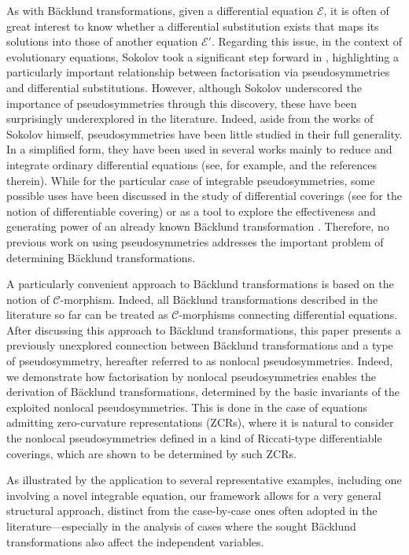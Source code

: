 \documentclass[12pt,english]{elsarticle}
\theoremstyle{plain}
\theoremstyle{plain}
\theoremstyle{remark}
\theoremstyle{plain}
\theoremstyle{definition}
\theoremstyle{definition}
\begin{document}
As with B\"{a}cklund transformations, given a differential equation
$\mathcal{E}$, it is often of great interest to know whether a differential
substitution exists that maps its solutions into those of another equation
$\mathcal{E}'$. Regarding this issue, in the context of evolutionary equations,
Sokolov took a significant step forward in \cite{Sokolov}, highlighting
a particularly important relationship between factorisation via pseudosymmetries
and differential substitutions. However, although Sokolov underscored the
importance of pseudosymmetries through this discovery, these have been
surprisingly underexplored in the literature. Indeed, aside from the works
of Sokolov himself, pseudosymmetries have been little studied in their
full generality. In a simplified form, they have been used in several works
mainly to reduce and integrate ordinary differential equations (see, for
example, \cite{Diego-lambda,Diego-Paola,Diego-Giuseppe,Muriel-Romero} and
the references therein). While for the particular case of integrable pseudosymmetries,
some possible uses have been discussed in the study of differential coverings
\cite{Chet,Chet-2} (see \cite{Kras-Vin} for the notion of differentiable
covering) or as a tool to explore the effectiveness and generating power
of an already known B\"{a}cklund transformation \cite{Marvan}. Therefore,
no previous work on using pseudosymmetries addresses the important problem
of determining B\"{a}cklund transformations.

A particularly convenient approach to B\"{a}cklund transformations is based
on the notion of $\mathcal{C }$-morphism. Indeed, all B\"{a}cklund
transformations described in the literature so far can be treated as
$\mathcal{C }$-morphisms connecting differential equations.
After discussing this approach to B\"{a}cklund transformations, this paper
presents a previously unexplored connection between B\"{a}cklund transformations
and a type of pseudosymmetry, hereafter referred to as nonlocal pseudosymmetries.
Indeed, we demonstrate how factorisation by nonlocal pseudosymmetries enables
the derivation of B\"{a}cklund transformations, determined by the basic
invariants of the exploited nonlocal pseudosymmetries. This is done in
the case of equations admitting zero-curvature representations (ZCRs),
where it is natural to consider the nonlocal pseudosymmetries defined in
a kind of Riccati-type differentiable coverings, which are shown to be
determined by such ZCRs.

As illustrated by the application to several representative examples, including
one involving a novel integrable equation, our framework allows for a very
general structural approach, distinct from the case-by-case ones often
adopted in the literature---especially in the analysis of cases where the
sought B\"{a}cklund transformations also affect the independent variables.
\end{document}
